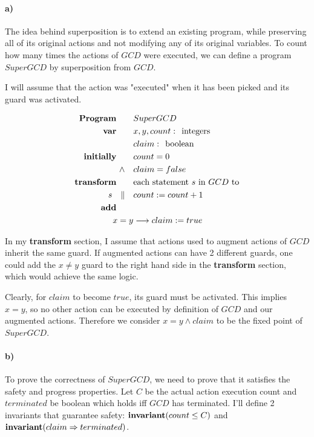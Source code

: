 \documentclass[10pt,letter]{article}
\begin{document}
\paragraph{a)} The idea behind superposition is to extend an existing program, while preserving all of its original actions and not modifying any of its original variables. To count how many times the actions of $GCD$ were executed, we can define a program $SuperGCD$ by superposition from $GCD$.

I will assume that the action was "executed" when it has been picked and its guard was activated.

\begin{align*}
\textrm{\textbf{Program}} \qquad & SuperGCD
\\
\textrm{\textbf{var}} \qquad & x, y, count\; \textrm{:\; integers}
\\ & claim\; \textrm{:\; boolean}
\\
\textrm{\textbf{initially}} \qquad & count = 0
\\ \land \quad & claim = false
\\
\textrm{\textbf{transform}} \qquad &\textrm{each statement $s$ in $GCD$ to}
\\
s \quad \Vert \quad & count := count + 1
\\
\textrm{\textbf{add}} \qquad & 
\\
x = y & \longrightarrow claim := true
\end{align*}

In my \textbf{transform} section, I assume that actions used to augment actions of $GCD$ inherit the same guard. If augmented actions can have 2 different guards, one could add the $x \neq y$ guard to the right hand side in the \textbf{transform} section, which would achieve the same logic.

Clearly, for $claim$ to become $true$, its guard must be activated. This implies $x = y$, so no other action can be executed by definition of $GCD$ and our augmented actions. Therefore we consider $x = y \land claim$ to be the fixed point of $SuperGCD$.

\paragraph{b)} To prove the correctness of $SuperGCD$, we need to prove that it satisfies the safety and progress properties. Let $C$ be the actual action execution count and $terminated$ be boolean which holds iff $GCD$ has terminated. I'll define 2 invariants that guarantee safety: ${\textbf{\textrm{invariant}}(count \leq C)}$ and ${\textbf{\textrm{invariant}}(claim \Rightarrow terminated)}$.
\end{document}
